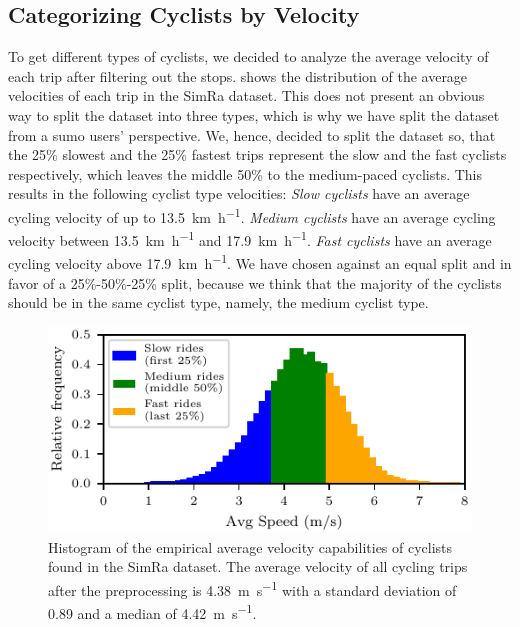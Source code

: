 \subsection{Categorizing Cyclists by Velocity}
\label{subsec:categorizing_by_velocity_preprocessing}
To get different types of cyclists, we decided to analyze the average velocity of each trip after filtering out the stops.
 shows the distribution of the average velocities of each trip in the SimRa dataset.
This does not present an obvious way to split the dataset into three types, which is why we have split the dataset from a \ac{sumo} users' perspective.
We, hence, decided to split the dataset so, that the \num{25}\% slowest and the \num{25}\% fastest trips represent the slow and the fast cyclists respectively, which leaves the middle \num{50}\% to the medium-paced cyclists.
This results in the following cyclist type velocities:
\textit{Slow cyclists} have an average cycling velocity of up to \SI{13.5}{\km\per\hour}.
\textit{Medium cyclists} have an average cycling velocity between \SI{13.5}{\km\per\hour} and \SI{17.9}{\km\per\hour}.
\textit{Fast cyclists} have an average cycling velocity above \SI{17.9}{\km\per\hour}.
We have chosen against an equal split and in favor of a \num{25}\%-\num{50}\%-\num{25}\% split, because we think that the majority of the cyclists should be in the same cyclist type, namely, the medium cyclist type.
\begin{figure}
  \centering
    \includegraphics[width=0.7\columnwidth]{fig/analysis_avg_velo_all.pdf}
    \caption{%
        Histogram of the empirical average velocity capabilities of cyclists found in the SimRa dataset. The average velocity of all cycling trips after the preprocessing is \SI{4.38}{\metre\per\second} with a standard deviation of \num{0.89} and a median of \SI{4.42}{\metre\per\second}.
    }%
    \label{fig:analysis_avg_vel_all}
\end{figure}

